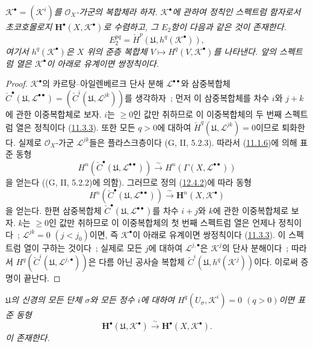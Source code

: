 \begin{proposition}[12.4.6]
\label{0.12.4.6-fr}
\emph{$\mathcal K^\bullet=(\mathcal K^i)$를 $\mathcal O_X$-가군의
복합체라 하자. $\mathcal K^\bullet$에 관하여 정칙인 스펙트럼 함자로서
초코호몰로지 $\mathbf H^\bullet(X,\mathcal K^\bullet)$로 수렴하고,
그 $E_2$항이 다음과 같은 것이 존재한다.}
\begin{equation}
\label{0.12.4.6.1-fr}
\tag{12.4.6.1}
E_2^{pq}=\check H^p(\mathfrak U,h^q(\mathcal K^\bullet)),
\end{equation}
\emph{여기서 $h^q(\mathcal K^\bullet)$은 $X$ 위의 준층 복합체
$V\mapsto H^q(V,\mathcal K^\bullet)$를 나타낸다. 앞의 스펙트럼 열은
$\mathcal K^\bullet$이 아래로 유계이면 쌍정칙이다.}
\end{proposition}

\begin{proof}
$\mathcal K^\bullet$의 카르탕--아일렌베르크 단사 분해
$\mathcal L^{\bullet\bullet}$와 삼중복합체
$\check C^\bullet(\mathfrak U,\mathcal L^{\bullet\bullet})
=(\check C^i(\mathfrak U,\mathcal L^{jk}))$를 생각하자~; 먼저 이
삼중복합체를 차수 $i$와 $j+k$에 관한 이중복합체로 보자. $i$는
$\geq0$인 값만 취하므로 이 이중복합체의 두 번째 스펙트럼 열은
정칙이다 (\hyperref[0.11.3.3-fr]{11.3.3}). 또한 모든 $q>0$에 대하여
$\check H^q(\mathfrak U,\mathcal L^{jk})=0$이므로 퇴화한다. 실제로
$\mathcal O_X$-가군 $\mathcal L^{jk}$들은 플라스크층이다
(G, II, 5.2.3). 따라서 (\hyperref[0.11.1.6-fr]{11.1.6})에 의해 표준
동형
\[
H^n(\check C^\bullet(\mathfrak U,\mathcal L^{\bullet\bullet}))
\xrightarrow{\sim}
H^n(\Gamma(X,\mathcal L^{\bullet\bullet}))
\]
을 얻는다 ((G, II, 5.2.2)에 의함). 그러므로 정의
(\hyperref[0.12.4.2-fr]{12.4.2})에 따라 동형
\[
H^n(\check C^\bullet(\mathfrak U,\mathcal L^{\bullet\bullet}))
\xrightarrow{\sim}\mathbf H^n(X,\mathcal K^\bullet)
\]
을 얻는다. 한편 삼중복합체
$\check C^\bullet(\mathfrak U,\mathcal L^{\bullet\bullet})$를 차수
$i+j$와 $k$에 관한 이중복합체로 보자. $k$는 $\geq0$인 값만 취하므로
이 이중복합체의 첫 번째 스펙트럼 열은 언제나 정칙이다~;
$\mathcal L^{jk}=0$ $(j<j_0)$이면, 즉 $\mathcal K^\bullet$이 아래로
유계이면 쌍정칙이다 (\hyperref[0.11.3.3-fr]{11.3.3}). 이 스펙트럼 열이
구하는 것이다~; 실제로 모든 $j$에 대하여
$\mathcal L^{j,\bullet}$은 $\mathcal K^j$의 단사 분해이다~; 따라서
$H^q(\check C^i(\mathfrak U,\mathcal L^{j,\bullet}))$은 다름 아닌
공사슬 복합체 $\check C^i(\mathfrak U,h^q(\mathcal K^j))$이다. 이로써
증명이 끝난다.
\end{proof}

\begin{corollary}[12.4.7]
\label{0.12.4.7-fr}
\emph{$\mathfrak U$의 신경의 모든 단체 $\sigma$와 모든 정수 $i$에
대하여 $H^q(U_\sigma,\mathcal K^i)=0$ $(q>0)$이면 표준 동형}
\begin{equation}
\label{0.12.4.7.1-fr}
\tag{12.4.7.1}
\mathbf H^\bullet(\mathfrak U,\mathcal K^\bullet)
\xrightarrow{\sim}\mathbf H^\bullet(X,\mathcal K^\bullet).
\end{equation}
\emph{이 존재한다.}
\end{corollary}

